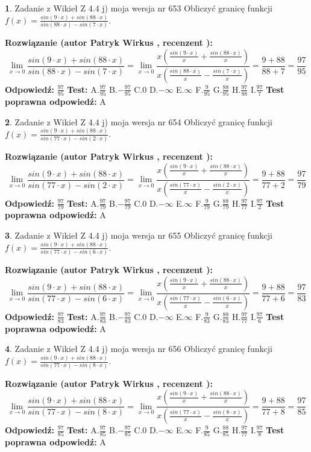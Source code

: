 \documentclass[12pt, a4paper]{article}
\theoremstyle{definition} %
\newtheorem{zad}{}
\newcommand{\zadStart}[1]{\begin{zad}#1\newline}
\newcommand{\zadStop}{\end{zad}}
\newcommand{\rozwStart}[2]{\noindent \textbf{Rozwiązanie (autor #1 , recenzent #2): }\newline}
\newcommand{\rozwStop}{\newline}
\newcommand{\odpStart}{\noindent \textbf{Odpowiedź:}\newline}
\newcommand{\odpStop}{\newline}
\newcommand{\testStart}{\noindent \textbf{Test:}\newline}
\newcommand{\testStop}{\newline}
\newcommand{\kluczStart}{\noindent \textbf{Test poprawna odpowiedź:}\newline}
\newcommand{\kluczStop}{\newline}
\begin{document}
\zadStart{Zadanie z Wikieł Z 4.4 j) moja wersja nr 653}
Obliczyć granicę funkcji $f(x)=\frac{sin(9\cdot x) +sin(88\cdot x)}{sin(88\cdot x) -sin(7\cdot x)}$.
\zadStop
\rozwStart{Patryk Wirkus}{}
$$\lim\limits_{x\to 0}\frac{sin(9\cdot x) +sin(88\cdot x)}{sin(88\cdot x) -sin(7\cdot x)}=\lim\limits_{x\to 0}\frac{x(\frac{sin(9\cdot x)}{x}+\frac{sin(88\cdot x)}{x})}{x(\frac{sin(88\cdot x)}{x}-\frac{sin(7\cdot x)}{x})}=\frac{9+88}{88+7} = \frac{97}{95}$$
\rozwStop
\odpStart
$\frac{97}{95}$
\odpStop
\testStart
A.$\frac{97}{95}$
B.$-\frac{97}{95}$
C.$0$
D.$-\infty$
E.$\infty$
F.$\frac{9}{95}$
G.$\frac{88}{95}$
H.$\frac{97}{88}$
I.$\frac{97}{7}$
\testStop
\kluczStart
A
\kluczStop



\zadStart{Zadanie z Wikieł Z 4.4 j) moja wersja nr 654}
Obliczyć granicę funkcji $f(x)=\frac{sin(9\cdot x) +sin(88\cdot x)}{sin(77\cdot x) -sin(2\cdot x)}$.
\zadStop
\rozwStart{Patryk Wirkus}{}
$$\lim\limits_{x\to 0}\frac{sin(9\cdot x) +sin(88\cdot x)}{sin(77\cdot x) -sin(2\cdot x)}=\lim\limits_{x\to 0}\frac{x(\frac{sin(9\cdot x)}{x}+\frac{sin(88\cdot x)}{x})}{x(\frac{sin(77\cdot x)}{x}-\frac{sin(2\cdot x)}{x})}=\frac{9+88}{77+2} = \frac{97}{79}$$
\rozwStop
\odpStart
$\frac{97}{79}$
\odpStop
\testStart
A.$\frac{97}{79}$
B.$-\frac{97}{79}$
C.$0$
D.$-\infty$
E.$\infty$
F.$\frac{9}{79}$
G.$\frac{88}{79}$
H.$\frac{97}{77}$
I.$\frac{97}{2}$
\testStop
\kluczStart
A
\kluczStop



\zadStart{Zadanie z Wikieł Z 4.4 j) moja wersja nr 655}
Obliczyć granicę funkcji $f(x)=\frac{sin(9\cdot x) +sin(88\cdot x)}{sin(77\cdot x) -sin(6\cdot x)}$.
\zadStop
\rozwStart{Patryk Wirkus}{}
$$\lim\limits_{x\to 0}\frac{sin(9\cdot x) +sin(88\cdot x)}{sin(77\cdot x) -sin(6\cdot x)}=\lim\limits_{x\to 0}\frac{x(\frac{sin(9\cdot x)}{x}+\frac{sin(88\cdot x)}{x})}{x(\frac{sin(77\cdot x)}{x}-\frac{sin(6\cdot x)}{x})}=\frac{9+88}{77+6} = \frac{97}{83}$$
\rozwStop
\odpStart
$\frac{97}{83}$
\odpStop
\testStart
A.$\frac{97}{83}$
B.$-\frac{97}{83}$
C.$0$
D.$-\infty$
E.$\infty$
F.$\frac{9}{83}$
G.$\frac{88}{83}$
H.$\frac{97}{77}$
I.$\frac{97}{6}$
\testStop
\kluczStart
A
\kluczStop



\zadStart{Zadanie z Wikieł Z 4.4 j) moja wersja nr 656}
Obliczyć granicę funkcji $f(x)=\frac{sin(9\cdot x) +sin(88\cdot x)}{sin(77\cdot x) -sin(8\cdot x)}$.
\zadStop
\rozwStart{Patryk Wirkus}{}
$$\lim\limits_{x\to 0}\frac{sin(9\cdot x) +sin(88\cdot x)}{sin(77\cdot x) -sin(8\cdot x)}=\lim\limits_{x\to 0}\frac{x(\frac{sin(9\cdot x)}{x}+\frac{sin(88\cdot x)}{x})}{x(\frac{sin(77\cdot x)}{x}-\frac{sin(8\cdot x)}{x})}=\frac{9+88}{77+8} = \frac{97}{85}$$
\rozwStop
\odpStart
$\frac{97}{85}$
\odpStop
\testStart
A.$\frac{97}{85}$
B.$-\frac{97}{85}$
C.$0$
D.$-\infty$
E.$\infty$
F.$\frac{9}{85}$
G.$\frac{88}{85}$
H.$\frac{97}{77}$
I.$\frac{97}{8}$
\testStop
\kluczStart
A
\kluczStop
\end{document}
